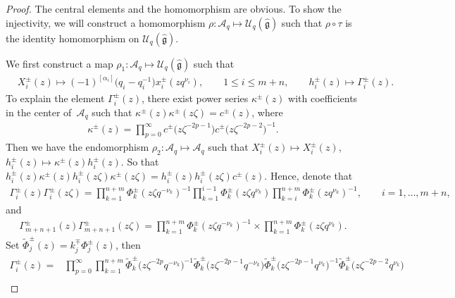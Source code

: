 \documentclass[pdftex]{sigma}
\numberwithin{equation}{section}
\begin{document}
\begin{proof}
 The central elements and the homomorphism are obvious. To show the injectivity, we will construct a homomorphism $\rho\colon \mathcal{A}_q\mapsto \mathcal{U}_q(\mathfrak{\hat{g}})$ such that $\rho\circ\tau$ is the identity homomorphism on $\mathcal{U}_q(\mathfrak{\hat{g}})$.

We first construct a map $\rho_1\colon \mathcal{A}_q\mapsto \mathcal{U}_q(\mathfrak{\hat{g}})$ such that
\begin{align*}
 & X_i^{\pm}(z)\mapsto (-1)^{[\alpha_{i}]}\bigl(q_i-q_i^{-1}\bigr)x_i^{\pm}(zq^{\nu_i}),\qquad 1\leq i\leq m+n,\qquad h_i^{\pm}(z)\mapsto \Gamma_i^{\pm}(z).
\end{align*}
To explain the element $\Gamma_i^{\pm}(z)$, there exist power series $\kappa^{\pm}(z)$ with coefficients in the center of~$\mathcal{A}_q$ such that $\kappa^{\pm}(z)\kappa^{\pm}(z\zeta)=c^{\pm}(z)$, where
\begin{gather}\label{kappa}
 \kappa^{\pm}(z)=\prod\limits_{p=0}^{\infty}c^{\pm}\bigl(z\zeta^{-2p-1}\bigr)c^{\pm}\bigl(z\zeta^{-2p-2}\bigr)^{-1}.
\end{gather}
Then we have the endomorphism $\rho_2\colon \mathcal{A}_q\mapsto\mathcal{A}_q$ such that $X_i^{\pm}(z)\mapsto X_i^{\pm}(z)$, $h_i^{\pm}(z)\mapsto \kappa^{\pm}(z)h_i^{\pm}(z)$. So that
$h_i^{\pm}(z)\kappa^{\pm}(z)h_i^{\pm}(z\zeta)\kappa^{\pm}(z\zeta)=h_i^{\pm}(z)h_i^{\pm}(z\zeta)c^{\pm}(z)$.
Hence, denote that
\begin{gather*}
 \Gamma_i^{\pm}(z)\Gamma_i^{\pm}(z\zeta)=\prod\limits_{k=1}^{n+m}\Phi^{\pm}_{k}(z\zeta q^{-\nu_k})^{-1}\prod\limits_{k=1}^{i-1}\Phi^{\pm}_{k}(z\zeta q^{\nu_k})\prod\limits_{k=i}^{n+m}\Phi^{\pm}_{k}(z q^{\nu_k})^{-1},\qquad i=1,\dots,m+n,
\end{gather*}
and
\begin{gather*}
 \Gamma_{m+n+1}^{\pm}(z)\Gamma_{m+n+1}^{\pm}(z\zeta)=\prod\limits_{k=1}^{n+m}\Phi^{\pm}_{k}(z\zeta q^{-\nu_k})^{-1}
 \times\prod\limits_{k=1}^{n+m}\Phi^{\pm}_{k}(z\zeta q^{\nu_k}).
\end{gather*}
Set $\widetilde{\Phi}^{\pm}_{j}(z)=k^{\mp}_j\Phi^{\pm}_{j}(z)$, then
\begin{align*}
 \Gamma_i^{\pm}(z)={}&\prod\limits_{p=0}^{\infty}\prod\limits_{k=1}^{n+m}\widetilde{\Phi}^{\pm}_{k}\bigl(z\zeta^{-2p} q^{-\nu_k}\bigr)^{-1}\widetilde{\Phi}^{\pm}_{k}\bigl(z\zeta^{-2p-1} q^{-\nu_k}\bigr)\widetilde{\Phi}^{\pm}_{k}\bigl(z\zeta^{-2p-1} q^{\nu_k}\bigr)^{-1}\widetilde{\Phi}^{\pm}_{k}\bigl(z\zeta^{-2p-2} q^{\nu_k}\bigr)\\

\end{align*}
\end{proof}
\end{document}
